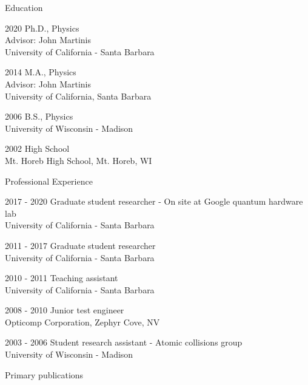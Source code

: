 \begin{vitae}
\begin{vitaesection}{Education}
\item [2020] Ph.D., Physics\\ Advisor: John Martinis \\ University of California - Santa Barbara
\item [2014] M.A., Physics\\ Advisor: John Martinis \\ University of California, Santa Barbara
\item [2006] B.S., Physics\\ University of Wisconsin - Madison
\item [2002] High School\\ Mt. Horeb High School, Mt. Horeb, WI
\end{vitaesection}

\begin{vitaesection}{Professional Experience}
\item [2017 - 2020] Graduate student researcher - On site at Google quantum hardware lab \\ University of California - Santa Barbara
\item [2011 - 2017] Graduate student researcher \\ University of California - Santa Barbara
\item [2010 - 2011] Teaching assistant \\University of California - Santa Barbara
\item [2008 - 2010] Junior test engineer \\ Opticomp Corporation,  Zephyr Cove, NV
\item [2003 - 2006] Student research assistant - Atomic collisions group \\ University of Wisconsin - Madison
\end{vitaesection}

\begin{vitaesectnodate}{Primary publications}

\end{vitaesectnodate}
\end{vitae}